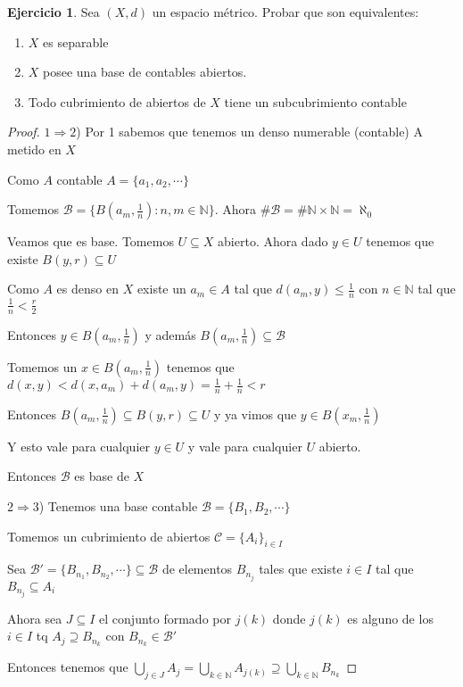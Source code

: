 \documentclass[12pt]{report}
\newcommand{\n}{\aleph_{0}}
\newcommand{\N}{\mathbb{N}}
\newcommand{\Ra}{\Rightarrow}
\theoremstyle{definition}
\newtheorem{ej}{Ejercicio}
\begin{document}
\begin{ej}
	Sea $(X,d)$ un espacio métrico. Probar que son equivalentes:
	\begin{enumerate}
	\item $X$ es separable		
	\item $X$ posee una base de contables abiertos.
	\item Todo cubrimiento de abiertos de $X$ tiene un subcubrimiento contable
	\end{enumerate}

	\begin{proof}
		$1 \Ra 2$) Por 1 sabemos que tenemos un denso numerable (contable) A metido en $X$

		Como $A$ contable $A = \{a_1,a_2,\cdots\}$

		Tomemos $\mathcal{B} = \{B(a_m,\frac{1}{n}) : n,m \in \N\}$. Ahora $\# \mathcal{B} = \# \N\times \N = \n$

		Veamos que es base. Tomemos $U \subseteq X$ abierto. Ahora dado $y \in U$ tenemos que existe $B(y,r) \subseteq U$

		Como $A$ es denso en $X$ existe un $a_m \in A$ tal que $d(a_m,y) \leq \frac{1}{n}$ con $n \in \N$ tal que $\frac{1}{n} < \frac{r}{2}$

		Entonces $y \in B(a_m,\frac{1}{n})$ y además $B(a_m,\frac{1}{n}) \subseteq \mathcal{B}$ 

		Tomemos un $x \in B(a_m,\frac{1}{n})$ tenemos que $d(x,y) < d(x,a_m) + d(a_m,y) = \frac{1}{n} + \frac{1}{n} < r$

		Entonces $B(a_m,\frac{1}{n}) \subseteq B(y,r) \subseteq U$ y ya vimos que $y \in B(x_m,\frac{1}{n})$ 

		Y esto vale para cualquier $y \in U$ y vale para cualquier $U$ abierto.

		Entonces $\mathcal{B}$ es base de $X$

		$2 \Ra 3$) Tenemos una base contable $\mathcal{B} = \{B_1,B_2, \cdots\}$ 

		Tomemos un cubrimiento de abiertos $\mathcal{C} = \{A_i\}_{i \in I}$ 

		Sea $\mathcal{B}' = \{B_{n_1}, B_{n_2},\cdots\} \subseteq \mathcal{B} $ de elementos $B_{n_j} $ tales que existe $ i \in I$ tal que $B_{n_j} \subseteq A_i$

		Ahora sea $J \subseteq I$ el conjunto formado por $j(k)$ donde $j(k)$ es alguno de los $i \in I$ tq $A_j \supseteq B_{n_k}$ con $B_{n_k} \in \mathcal{B}'$

		Entonces tenemos que $\bigcup_{j \in J} A_j = \bigcup_{k\in\N} A_{j(k)} \supseteq \bigcup_{k\in\N} B_{n_k}$


\end{proof}
\end{ej}
\end{document}
